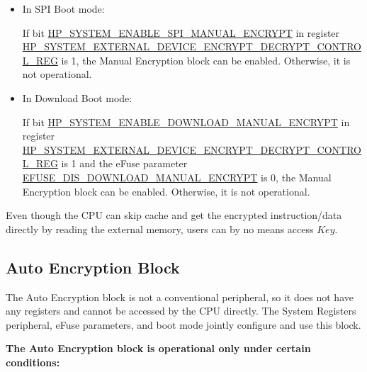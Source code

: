 \documentclass[main\_\_EN.tex]{subfiles}
\begin{document}
\begin{itemize}

    \item In SPI Boot mode:

    If bit \hyperref[fielddesc:HPSYSTEMENABLESPIMANUALENCRYPT]{HP\_SYSTEM\_ENABLE\_SPI\_MANUAL\_ENCRYPT} in register\\ \hyperref[regdesc:HPSYSTEMEXTERNALDEVICEENCRYPTDECRYPTCONTROLREG]{HP\_SYSTEM\_EXTERNAL\_DEVICE\_ENCRYPT\_DECRYPT\_CONTROL\_REG} is 1, the Manual Encryption block can be enabled. Otherwise, it is not operational.

    \item In Download Boot mode:

    If bit \hyperref[fielddesc:HPSYSTEMENABLEDOWNLOADMANUALENCRYPT]{HP\_SYSTEM\_ENABLE\_DOWNLOAD\_MANUAL\_ENCRYPT} in register\\ \hyperref[regdesc:HPSYSTEMEXTERNALDEVICEENCRYPTDECRYPTCONTROLREG]{HP\_SYSTEM\_EXTERNAL\_DEVICE\_ENCRYPT\_DECRYPT\_CONTROL\_REG} is 1 and the eFuse parameter\\ \hyperref[fielddesc:EFUSEDISDOWNLOADMANUALENCRYPT]{EFUSE\_DIS\_DOWNLOAD\_MANUAL\_ENCRYPT} is 0, the Manual Encryption block can be enabled. Otherwise, it is not operational.

\end{itemize}


\begin{tiplisting}
\vspace{-2em}
\begin{enumerate}
Even though the CPU can skip cache and get the encrypted instruction/data directly by reading the external memory, users can by no means access \begin{math}\mathit{Key}\end{math}.
\end{enumerate}
\end{tiplisting}

\subsection{Auto Encryption Block}

The Auto Encryption block is not a conventional peripheral, so it does not have any registers and cannot be accessed by the CPU directly. The System Registers peripheral, eFuse parameters, and boot mode jointly configure and use this block.

\textbf{The Auto Encryption block is operational only under certain conditions:}
\end{document}
